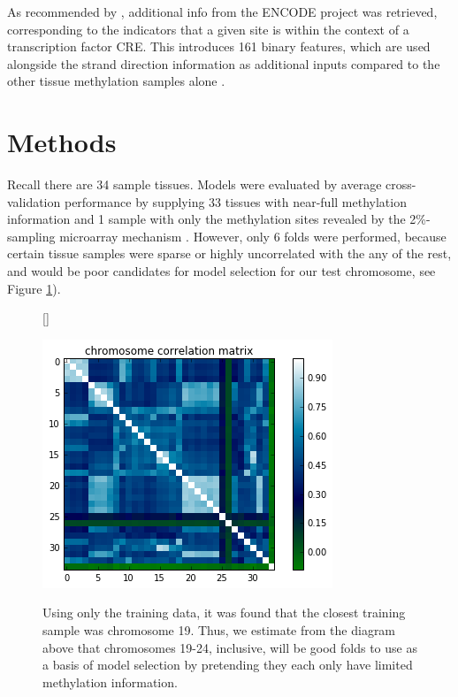 \documentclass{article} %
\begin{document}
As recommended by \cite{zhang2015predicting}, additional info from the ENCODE project was retrieved, corresponding to the indicators that a given site is within the context of a transcription factor CRE. This introduces 161 binary features, which are used alongside the strand direction information as additional inputs compared to the other tissue methylation samples alone \cite{encode2004encode}.
\section{Methods}

Recall there are 34 sample tissues. Models were evaluated by average cross-validation performance by supplying 33 tissues with near-full methylation information and 1 sample with only the methylation sites revealed by the 2\%-sampling microarray mechanism \cite{infinium}. However, only 6 folds were performed, because certain tissue samples were sparse or highly uncorrelated with the any of the rest, and would be poor candidates for model selection for our test chromosome, see Figure \ref{fig:chromacorr}).

\begin{figure}[H]
    \centering
{}[\FBwidth]
{
    \caption{Using only the training data, it was found that the closest training sample was chromosome 19. Thus, we estimate from the diagram above that chromosomes 19-24, inclusive, will be good folds to use as a basis of model selection by pretending they each only have limited methylation information.}
    \label{fig:chromacorr}}
    {\includegraphics[scale=0.5]{chromacorr.png}}
\end{figure} 
\end{document}

